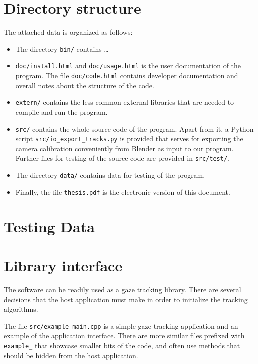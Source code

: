 
\setcounter{section}{0}
\renewcommand{\thesection}{\Alph{section}}

\section{Directory structure}
\label{s:dirstructure}

The attached data is organized as follows:

\begin{itemize}
\item The directory {\tt bin/} contains \dots

\item {\tt doc/install.html} and {\tt doc/usage.html} is the user documentation of the program.
The file {\tt doc/code.html} contains developer documentation and overall notes about the structure of the code.

\item {\tt extern/} contains the less common external libraries that are needed to compile and run the program.

\item {\tt src/} contains the whole source code of the program.
Apart from it, a Python script {\tt src/io\_export\_tracks.py} is provided that serves for exporting the camera calibration conveniently from Blender as input to our program.
Further files for testing of the source code are provided in {\tt src/test/}.

\item The directory {\tt data/} contains data for testing of the program.

\item Finally, the file {\tt thesis.pdf} is the electronic version of this document.

\end{itemize}

\section{Testing Data}
\label{s:testingdata}

\todo{\dots}

\section{Library interface}

The software can be readily used as a gaze tracking library.
There are several decisions that the host application must make in order to initialize the tracking algorithms.
\todo{\dots}

The file {\tt src/example\_main.cpp} is a simple gaze tracking application and an example of the application interface.
There are more similar files prefixed with {\tt example\_} that showcase smaller bits of the code, and often use methods that should be hidden from the host application.
